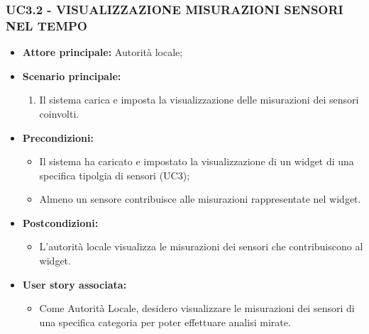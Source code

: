 \subsubsection{UC3.2 - VISUALIZZAZIONE MISURAZIONI SENSORI NEL TEMPO}
\begin{itemize}
    \item \textbf{Attore principale:} Autorità locale;
    \item \textbf{Scenario principale:}
        \begin{enumerate}
            \item Il sistema carica e imposta la visualizzazione delle misurazioni dei sensori coinvolti.
        \end{enumerate}
    \item \textbf{Precondizioni:}
        \begin{itemize}
            \item Il sistema ha caricato e impostato la visualizzazione di un widget di una specifica tipolgia di sensori (UC3);
            \item Almeno un sensore contribuisce alle misurazioni rappresentate nel widget.
        \end{itemize}
    \item \textbf{Postcondizioni:}
        \begin{itemize}
            \item  L'autorità locale visualizza le misurazioni dei sensori che contribuiscono al widget.
        \end{itemize}
    \item \textbf{User story associata:}
        \begin{itemize}
            \item Come Autorità Locale, desidero visualizzare le misurazioni dei sensori di una specifica categoria per poter effettuare analisi mirate.
        \end{itemize}
\end{itemize}